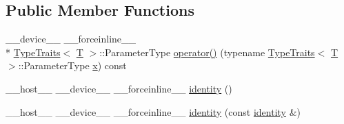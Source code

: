 \subsection*{Public Member Functions}
\begin{DoxyCompactItemize}
\item 
\-\_\-\-\_\-device\-\_\-\-\_\- \-\_\-\-\_\-forceinline\-\_\-\-\_\- \\*
\hyperlink{structcv_1_1gpu_1_1device_1_1TypeTraits}{Type\-Traits}$<$ \hyperlink{calib3d_8hpp_a3efb9551a871ddd0463079a808916717}{T} $>$\-::Parameter\-Type \hyperlink{structcv_1_1gpu_1_1device_1_1identity_a1ab8e2a800999859fb657158bf775e4a}{operator()} (typename \hyperlink{structcv_1_1gpu_1_1device_1_1TypeTraits}{Type\-Traits}$<$ \hyperlink{calib3d_8hpp_a3efb9551a871ddd0463079a808916717}{T} $>$\-::Parameter\-Type \hyperlink{highgui__c_8h_a6150e0515f7202e2fb518f7206ed97dc}{x}) const 
\item 
\-\_\-\-\_\-host\-\_\-\-\_\- \-\_\-\-\_\-device\-\_\-\-\_\- \-\_\-\-\_\-forceinline\-\_\-\-\_\- \hyperlink{structcv_1_1gpu_1_1device_1_1identity_a0e381c6d08c4058b21122b0d9bb9574d}{identity} ()
\item 
\-\_\-\-\_\-host\-\_\-\-\_\- \-\_\-\-\_\-device\-\_\-\-\_\- \-\_\-\-\_\-forceinline\-\_\-\-\_\- \hyperlink{structcv_1_1gpu_1_1device_1_1identity_a23db83328ae964b3a292c33072f0c450}{identity} (const \hyperlink{structcv_1_1gpu_1_1device_1_1identity}{identity} \&)
\end{DoxyCompactItemize}


